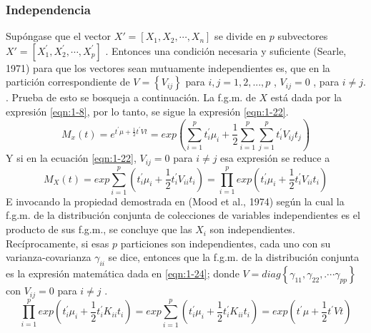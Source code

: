 \subsubsection{Independencia}
Supóngase que el vector $X'=\left[X_1,X_2,\cdots,X_n\right]$  se divide en  $p$ subvectores $X'=\left[X_1^\prime,X_2^\prime,\cdots,X_p^\prime\right]$  . Entonces una condición necesaria y suficiente (Searle, 1971) para que los vectores sean mutuamente independientes es, que en la partición correspondiente de $V=\left\{V_{ij}\right\}$  para $i,j=1,2,...,p$ , $V_{ij}=0$ , para $i\neq j.$ .  Prueba de esto se bosqueja a continuación. La f.g.m. de  $X$  está dada por la expresión \ref{eqn:1-8}, por lo tanto, se sigue la expresión \ref{eqn:1-22}.
\begin{equation}
    M_x\left(t\right)=e^{t^\prime\mu+\frac{1}{2}t^\prime V t}=exp{\left(\sum_{i=1}^{p}{t_i^\prime\mu_i}+\frac{1}{2}\sum_{i=1}^{p}\sum_{j=1}^{p}{t_i^\prime V_{ij}t_j}\right)}
    \label{eqn:1-22}
\end{equation}
Y si en la ecuación \ref{eqn:1-22},  $V_{ij}=0$  para $i\neq j$  esa expresión se reduce a
\begin{equation}
    M_X\left(t\right)=exp{\sum_{i=1}^{p}\left(t_i^\prime\mu_i+\frac{1}{2}t_i^\prime V_{ii}t_i\right)}=\prod_{i=1}^{p}exp{\left(t_i^\prime\mu_i+\frac{1}{2}t_i^\prime V_{ii}t_i\right)}
    \label{eqn:1-23}
\end{equation}
E invocando la propiedad demostrada en (Mood et al., 1974) según la cual la f.g.m. de la distribución conjunta de colecciones de variables independientes es el producto de sus f.g.m., se concluye que las $X_i$  son independientes. Recíprocamente, si esas  $p$ particiones son independientes, cada uno con su varianza-covarianza  $\gamma_{ii}$ se dice, entonces que la f.g.m. de la distribución conjunta es la expresión matemática dada en \ref{eqn:1-24}; donde $V=diag\left\{\gamma_{11},\gamma_{22},.\cdots\gamma_{pp}\right\}$  con $V_{ij}=0$  para $i\neq j$  .
\begin{equation}
    \prod_{i=1}^{p}exp{\left(t_i^\prime\mu_i+\frac{1}{2}t_i^\prime K_{ii}t_i\right)}=exp{\sum_{i=1}^{p}{\left(t_i^\prime\mu_i+\frac{1}{2}t_i^\prime K_{ii}t_i\right)=exp{\left(t^\prime\mu+\frac{1}{2}t^\prime V t\right)}}}
    \label{eqn:1-24}
\end{equation}
